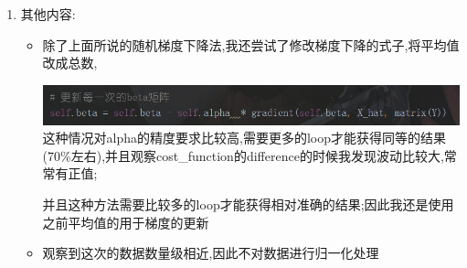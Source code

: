 \documentclass[11pt, a4paper, UTF8]{ctexart}
\begin{document}
\begin{solution}
\begin{enumerate}
\begin{enumerate}
\begin{table}[h]
	\end{table}
	\end{enumerate}
\newpage
\item 其他内容:

\begin{itemize}
	\item 除了上面所说的随机梯度下降法,我还尝试了修改梯度下降的式子,将平均值改成总数,
	
	\includegraphics[scale=0.5]{try.png}\\
	
	这种情况对alpha的精度要求比较高,需要更多的loop才能获得同等的结果(70\%左右),并且观察cost\_function的difference的时候我发现波动比较大,常常有正值;
	
	并且这种方法需要比较多的loop才能获得相对准确的结果;因此我还是使用之前平均值的用于梯度的更新
	
	\item 观察到这次的数据数量级相近,因此不对数据进行归一化处理
\end{itemize}

\end{enumerate}
    
\end{solution}





   







   





	
    
\end{document}

